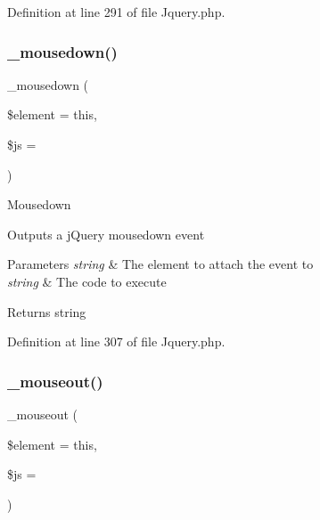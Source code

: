 Definition at line 291 of file Jquery.\+php.

\mbox{\label{class_c_i___jquery_a95cb3f44c2413b0fbe51734b346f4d92}} 
\subsubsection{\texorpdfstring{\_mousedown()}{\_mousedown()}}
{\footnotesize\ttfamily \+\_\+mousedown (\begin{DoxyParamCaption}\item[{}]{\$element = {\ttfamily \textquotesingle{}this\textquotesingle{}},  }\item[{}]{\$js = {\ttfamily \textquotesingle{}\textquotesingle{}} }\end{DoxyParamCaption})\hspace{0.3cm}{\ttfamily [protected]}}

Mousedown

Outputs a j\+Query mousedown event


\begin{DoxyParams}{Parameters}
{\em string} & The element to attach the event to \\
\hline
{\em string} & The code to execute \\
\hline
\end{DoxyParams}
\begin{DoxyReturn}{Returns}
string 
\end{DoxyReturn}


Definition at line 307 of file Jquery.\+php.

\mbox{\label{class_c_i___jquery_a8a575b3b64cda3a24434e8fed1553124}} 
\subsubsection{\texorpdfstring{\_mouseout()}{\_mouseout()}}
{\footnotesize\ttfamily \+\_\+mouseout (\begin{DoxyParamCaption}\item[{}]{\$element = {\ttfamily \textquotesingle{}this\textquotesingle{}},  }\item[{}]{\$js = {\ttfamily \textquotesingle{}\textquotesingle{}} }\end{DoxyParamCaption})\hspace{0.3cm}{\ttfamily [protected]}}

